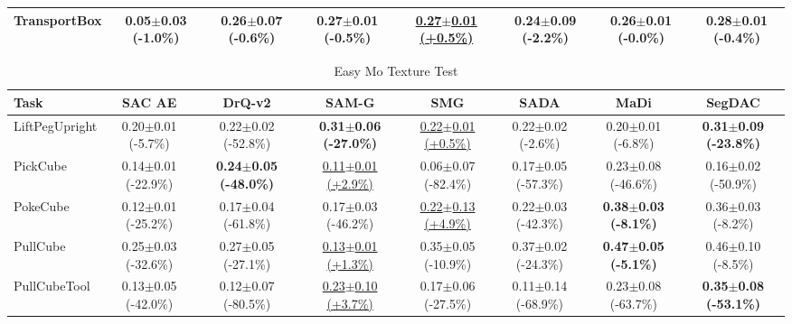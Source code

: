 \begin{table}[htbp]
\begin{adjustbox}{max width=\textwidth}
\begin{tabular}{l*{7}{c}}
TransportBox & 0.05$\pm$0.03 \scriptsize{(-1.0\%)} & 0.26$\pm$0.07 \scriptsize{(-0.6\%)} & 0.27$\pm$0.01 \scriptsize{(-0.5\%)} & \underline{0.27$\pm$0.01 \scriptsize{(+0.5\%)}} & 0.24$\pm$0.09 \scriptsize{(-2.2\%)} & 0.26$\pm$0.01 \scriptsize{(-0.0\%)} & \textbf{0.28$\pm$0.01 \scriptsize{(-0.4\%)}} \\
\bottomrule
\end{tabular}
\end{adjustbox}
\end{table}

\begin{table}[htbp]
\centering
\scriptsize
\caption{Easy Mo Texture Test}
\label{tab:appendix_motexturetest_easy}
\begin{adjustbox}{max width=\textwidth}
\begin{tabular}{l*{7}{c}}
\toprule
\textbf{Task} & \textbf{SAC AE} & \textbf{DrQ-v2} & \textbf{SAM-G} & \textbf{SMG} & \textbf{SADA} & \textbf{MaDi} & \textbf{SegDAC} \\
\midrule
LiftPegUpright & 0.20$\pm$0.01 \scriptsize{(-5.7\%)} & 0.22$\pm$0.02 \scriptsize{(-52.8\%)} & \textbf{0.31$\pm$0.06 \scriptsize{(-27.0\%)}} & \underline{0.22$\pm$0.01 \scriptsize{(+0.5\%)}} & 0.22$\pm$0.02 \scriptsize{(-2.6\%)} & 0.20$\pm$0.01 \scriptsize{(-6.8\%)} & \textbf{0.31$\pm$0.09 \scriptsize{(-23.8\%)}} \\
PickCube & 0.14$\pm$0.01 \scriptsize{(-22.9\%)} & \textbf{0.24$\pm$0.05 \scriptsize{(-48.0\%)}} & \underline{0.11$\pm$0.01 \scriptsize{(+2.9\%)}} & 0.06$\pm$0.07 \scriptsize{(-82.4\%)} & 0.17$\pm$0.05 \scriptsize{(-57.3\%)} & 0.23$\pm$0.08 \scriptsize{(-46.6\%)} & 0.16$\pm$0.02 \scriptsize{(-50.9\%)} \\
PokeCube & 0.12$\pm$0.01 \scriptsize{(-25.2\%)} & 0.17$\pm$0.04 \scriptsize{(-61.8\%)} & 0.17$\pm$0.03 \scriptsize{(-46.2\%)} & \underline{0.22$\pm$0.13 \scriptsize{(+4.9\%)}} & 0.22$\pm$0.03 \scriptsize{(-42.3\%)} & \textbf{0.38$\pm$0.03 \scriptsize{(-8.1\%)}} & 0.36$\pm$0.03 \scriptsize{(-8.2\%)} \\
PullCube & 0.25$\pm$0.03 \scriptsize{(-32.6\%)} & 0.27$\pm$0.05 \scriptsize{(-27.1\%)} & \underline{0.13$\pm$0.01 \scriptsize{(+1.3\%)}} & 0.35$\pm$0.05 \scriptsize{(-10.9\%)} & 0.37$\pm$0.02 \scriptsize{(-24.3\%)} & \textbf{0.47$\pm$0.05 \scriptsize{(-5.1\%)}} & 0.46$\pm$0.10 \scriptsize{(-8.5\%)} \\
PullCubeTool & 0.13$\pm$0.05 \scriptsize{(-42.0\%)} & 0.12$\pm$0.07 \scriptsize{(-80.5\%)} & \underline{0.23$\pm$0.10 \scriptsize{(+3.7\%)}} & 0.17$\pm$0.06 \scriptsize{(-27.5\%)} & 0.11$\pm$0.14 \scriptsize{(-68.9\%)} & 0.23$\pm$0.08 \scriptsize{(-63.7\%)} & \textbf{0.35$\pm$0.08 \scriptsize{(-53.1\%)}} \\

\end{tabular}
\end{adjustbox}
\end{table}

